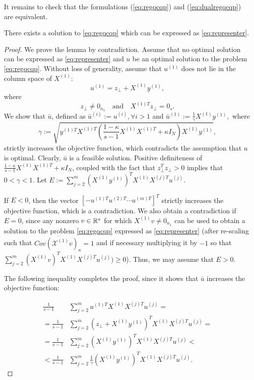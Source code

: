 It remains to check that the formulations (\ref{eq:regqcqp}) and (\ref{eq:dualregqcqp}) 
are equivalent.
\begin{lemma}
There exists a solution to \eqref{eq:regqcqp} which can be expressed as \eqref{eq:representer}.
\end{lemma}
\begin{proof}
We prove the lemma by contradiction. Assume that no optimal solution
can be expressed as \eqref{eq:representer} and $u$ be an optimal solution to the 
problem \eqref{eq:regqcqp}. Without loss of generality, assume 
that $u^{(1)}$ does not lie in the column space of $X^{(1)}$:
 $$u^{(1)} = z_{\bot} + X^{(1)} y^{(1)},$$
 where $$z_{\bot} \neq 0_{n_1}\quad \text{and}\quad X^{(1)T}z_{\bot} = 0_s.$$
We show that $\bar{u}$, defined as $\bar{u}^{(i)} := u^{(i)}, \forall i> 1$ 
and $\bar{u}^{(1)} := \frac{1}{\gamma}  X^{(1)} y^{(1)},$ where
\begin{equation*}
\gamma :=\sqrt{ y^{(1)T} X^{(1)T} \left(\frac{1- \kappa}{s - 1}X^{(1)} X^{(1)T} + \kappa  I_N\right) X^{(1)} y^{(1)} },
\end{equation*}
strictly increases the objective function, which contradicts the assumption 
that $u$ is optimal. Clearly, $\bar{u}$ is a feasible solution. Positive 
definiteness of $\frac{1- \kappa}{s - 1}X^{(1)} X^{(1)T} + \kappa  I_N$, 
coupled with the fact that $z_{\bot}^T z_{\bot} > 0$ implies that 
$0 < \gamma < 1$. Let $E := \sum_{j = 2}^m \left(X^{(1)} y^{(1)}\right)^T X^{(1)}X^{(j)T} u^{(j)}$.

If $E < 0$, then the vector $[-u^{(1)T} u^{(2)T} \cdots u^{(m)T}]^T$ strictly increases the
objective function, which is a contradiction. We also obtain a contradiction if $E = 0$, 
since any nonzero $v \in \mathbb{R}^{s}$ for which $X^{(1)}v \neq 0_{n_1}$ can be used to obtain 
a solution to the problem \eqref{eq:regqcqp} expressed as \eqref{eq:representer} 
(after re-scaling  such that $\overline{Cov\left(\mathcal{X}^{(1)}v\right)_\kappa} = 1$ 
and if necessary multiplying it by $-1$ so that $\sum_{j = 2}^m \left(X^{(1)} v\right)^T X^{(1)}X^{(j)T} u^{(j)}) \geq 0$).
Thus, we may assume that $E > 0$.

The following inequality completes the proof, since it shows that $\bar{u}$ increases the objective function:

\begin{align*}
  \frac{1}{s -1} & \sum_{j = 2}^m u^{(1)T} X^{(1)}X^{(j)T} u^{(j)} =\\
= \frac{1}{s -1} & \sum_{j = 2}^m \left(z_{\bot} + X^{(1)} y^{(1)}\right)^T X^{(1)}X^{(j)T} u^{(j)} = \\
= \frac{1}{s -1}  &\sum_{j = 2}^m \left(X^{(1)} y^{(1)}\right)^T X^{(1)}X^{(j)T} u^{(j)} < \\
< \frac{1}{s -1}  &\sum_{j = 2}^m \frac{1}{\gamma}\left(X^{(1)} y^{(1)}\right)^T X^{(1)}X^{(j)T} u^{(j)}.
\end{align*}
\end{proof}

